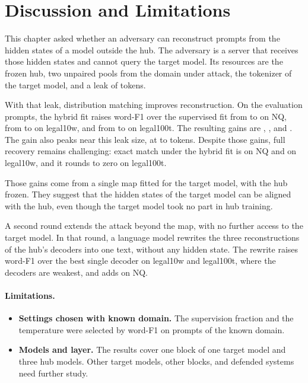 \section{Discussion and Limitations}\label{sec:attack:discussion}

This chapter asked whether an adversary can reconstruct prompts from the hidden states of a model outside the hub.
The adversary is a server that receives those hidden states and cannot query the target model.
Its resources are the frozen hub, two unpaired pools from the domain under attack, the tokenizer of the target model, and a leak of  tokens.

With that leak, distribution matching improves reconstruction.
On the evaluation prompts, the hybrid fit raises word-F1 over the supervised fit from  to  on NQ, from  to  on legal10w, and from  to  on legal100t.
The resulting gains are , , and .
The gain also peaks near this leak size, at  to  tokens.
Despite those gains, full recovery remains challenging: exact match under the hybrid fit is  on NQ and  on legal10w, and it rounds to zero on legal100t.

Those gains come from a single map fitted for the target model, with the hub frozen.
They suggest that the hidden states of the target model can be aligned with the hub, even though the target model took no part in hub training.

A second round extends the attack beyond the map, with no further access to the target model.
In that round, a language model rewrites the three reconstructions of the hub's decoders into one text, without any hidden state.
The rewrite raises word-F1 over the best single decoder on legal10w and legal100t, where the decoders are weakest, and adds  on NQ.

\paragraph{Limitations.}
\begin{itemize}
\item \textbf{Settings chosen with known domain.} The supervision fraction and the temperature were selected by word-F1 on  prompts of the known domain.
\item \textbf{Models and layer.} The results cover one block of one target model and three hub models.
Other target models, other blocks, and defended systems need further study.
\end{itemize}